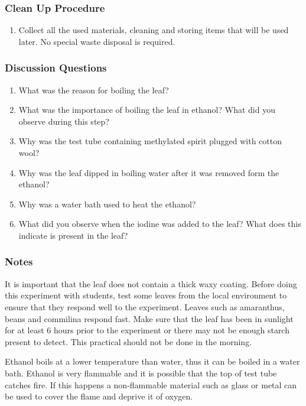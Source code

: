 \subsubsection*{Clean Up Procedure}
\begin{enumerate}
\item{Collect all the used materials, cleaning and storing items that will be used later. No special waste disposal is required.}
\end{enumerate}

\subsubsection*{Discussion Questions}
\begin{enumerate}
\item{What was the reason for boiling the leaf?}
\item{What was the importance of boiling the leaf in ethanol? What did you observe during this step?}
\item{Why was the test tube containing methylated spirit plugged with cotton wool?}
\item{Why was the leaf dipped in boiling water after it was removed form the ethanol?}
\item{Why was a water bath used to heat the ethanol?}
\item{What did you observe when the iodine was added to the leaf? What does this indicate is present in the leaf?}
\end{enumerate}

\subsubsection*{Notes}
It is important that the leaf does not contain a thick waxy coating. Before doing this experiment with students, test some leaves from the local environment to ensure that they respond well to the experiment. Leaves such as amaranthus, beans and commilina respond fast. Make sure that the leaf has been in sunlight for at least 6 hours prior to the experiment or there may not be enough starch present to detect. This practical should not be done in the morning.

Ethanol boils at a lower temperature than water, thus it can be boiled in a water bath. Ethanol is very flammable and it is possible that the top of test tube catches fire. If this happens a non-flammable material such as glass or metal can be used to cover the flame and deprive it of oxygen.


